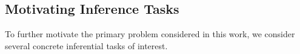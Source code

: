 \documentclass[10pt]{article}
\newcommand{\0}{{\mathbf{0}}}
\newcommand{\1}{{\mathbf{1}}}
\begin{document}
 
\subsection{Motivating Inference Tasks}
\label{sec:introapplications}
To further motivate the primary problem considered in this work, we consider several concrete inferential tasks of interest. 
\end{document}
